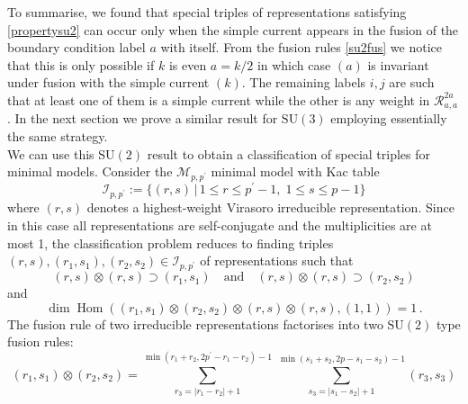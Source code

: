 \documentclass[a4paper,11pt]{article}
\theoremstyle{plain}
\theoremstyle{definition}
\begin{document}
To summarise, we found that special triples of representations satisfying \eqref{propertysu2} can occur only when the simple current appears in the fusion of the boundary condition label $a$ with itself. From the fusion rules \eqref{su2fus} we notice that this is only possible if $k$ is even $a=k/2$ in which case  $(a)$ is invariant under fusion with the simple current $(k)$. The remaining labels $i,j$ are such that at least one of them is a simple current while the other is any weight in $\mathcal{R}^{2a}_{a,a}$. 
In the next section we prove a similar result for $\mathrm{SU(3)}$ employing essentially the same strategy.\\



    We can use this $\mathrm{SU}(2)$ result to obtain a classification of special triples for minimal models. Consider the $\mathcal{M}_{p,p^\prime}$ minimal model  with Kac table
\begin{equation}
        \mathcal{I}_{p,p^\prime}:=\{(r,s)\,|\, 1\leq r\leq p^\prime-1,\; 1\leq s\leq p-1\} 
    \end{equation}
    where $(r,s)$ denotes a highest-weight Virasoro irreducible representation. Since in this case all representations are self-conjugate and the multiplicities are at most 1, the classification problem reduces to finding triples $(r,s),(r_1,s_1),(r_2,s_2)\in \mathcal{I}_{p,p^\prime}$ of representations such that
    \begin{equation}\label{mini1}
       (r,s)\otimes(r,s) \supset (r_1,s_1) \quad \text{and}\quad (r,s)\otimes (r,s)\supset (r_2,s_2)
    \end{equation}
    and
    \begin{equation}\label{mini2}
        \operatorname{dim}\operatorname{Hom}\left((r_1,s_1)\otimes(r_2,s_2)\otimes(r,s)\otimes(r,s),(1,1)\right)=1\,.
    \end{equation}
     The fusion rule of two irreducible representations factorises into two $\mathrm{SU}(2)$ type fusion rules:
     \begin{equation}\label{minimalfus}
        (r_1,s_1)\otimes(r_2,s_2)=\sum_{r_3=|r_1-r_2|+1}^{\operatorname{min}(r_1+r_2,2p^\prime-r_1-r_2)-1}\,\sum_{s_3=|s_1-s_2|+1}^{\operatorname{min}(s_1+s_2,2p-s_1-s_2)-1}(r_3,s_3)
    \end{equation}
\end{document}
